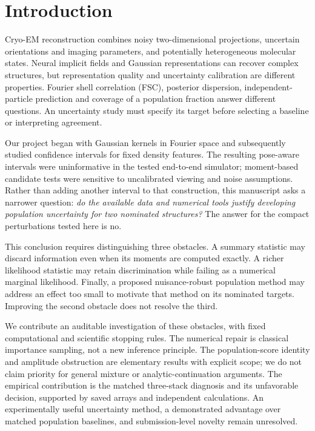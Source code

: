 \documentclass{article}
\begin{document}
\section{Introduction}
Cryo-EM reconstruction combines noisy two-dimensional projections, uncertain
orientations and imaging parameters, and potentially heterogeneous molecular
states. Neural implicit fields and Gaussian representations can recover
complex structures, but representation quality and uncertainty calibration
are different properties. Fourier shell correlation (FSC), posterior
dispersion, independent-particle prediction and coverage of a population
fraction answer different questions. An uncertainty study must specify its
target before selecting a baseline or interpreting agreement.

Our project began with Gaussian kernels in Fourier space and subsequently
studied confidence intervals for fixed density features. The resulting
pose-aware intervals were uninformative in the tested end-to-end simulator;
moment-based candidate tests were sensitive to uncalibrated viewing and noise
assumptions. Rather than adding another interval to that construction, this
manuscript asks a narrower question: \emph{do the available data and numerical
tools justify developing population uncertainty for two nominated structures?}
The answer for the compact perturbations tested here is no.

This conclusion requires distinguishing three obstacles. A summary statistic
may discard information even when its moments are computed exactly. A richer
likelihood statistic may retain discrimination while failing as a numerical
marginal likelihood. Finally, a proposed nuisance-robust population method
may address an effect too small to motivate that method on its nominated
targets. Improving the second obstacle does not resolve the third.

We contribute an auditable investigation of these obstacles, with fixed
computational and scientific stopping rules. The numerical repair is classical
importance sampling, not a new inference principle. The population-score
identity and amplitude obstruction are elementary results with explicit
scope; we do not claim priority for general mixture or analytic-continuation
arguments. The empirical contribution is the matched three-stack diagnosis
and its unfavorable decision, supported by saved arrays and independent
calculations. An experimentally useful uncertainty method, a demonstrated
advantage over matched population baselines, and submission-level novelty
remain unresolved.
\end{document}
